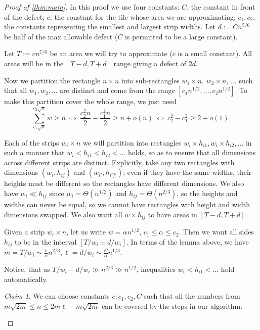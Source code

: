 \documentclass[11pt, reqno, psamsfonts]{amsart}
\theoremstyle{plain}
\theoremstyle{definition}
\theoremstyle{remark}
\newtheorem{claim}[theorem]{Claim}
\begin{document}
\begin{proof}[Proof of \cref{thm:main}]
In this proof we use four constants: $C$, the constant in front of the defect; $c$, the constant for the tile whose area we are approximating; $c_1, c_2$, the constants representing the smallest and largest strip widths.
Let $d := Cn^{5/6}$ be half of the max allowable defect ($C$ is permitted to be a large constant).

Let $T := cn^{7/6}$ be an area we will try to approximate ($c$ is a small constant). All areas will be in the $[T - d, T + d]$ range giving a defect of $2d$.

Now we partition the rectangle $n \times n$ into sub-rectangles $w_1 \times n$, $w_2 \times n$, $\ldots$ such that all $w_1, w_2, \ldots$ are distinct and come from the range $[c_1 n^{1/2}, \ldots, c_2 n^{1/2}]$. To make this partition cover the whole range, we just need 
\[
\sum_{c_1\sqrt{n}}^{c_2\sqrt{n}}w\geq n\ 
\Leftrightarrow\ 
\frac{c_2^2n}{2}-\frac{c_1^2n}{2}\geq n+o(n)\ 
\Leftrightarrow\ 
c_2^2 - c_1^2 \geq 2 + o(1).
\]

Each of the strips $w_i \times n$ we will partition into rectangles $w_i \times h_{i1}, w_i \times h_{i2}, \ldots$ in such a manner that  $w_i < h_{i1} < h_{i2} < \ldots$ holds, so as to ensure that all dimensions across different strips are distinct. Explicitly, take any two rectangles with dimensions $(w_i,h_{ij})$ and $(w_{i'},h_{i'j'})$; even if they have the same widths, their heights must be different so the rectangles have different dimensions. We also have $w_i \ll h_{ij}$ since $w_i=\Theta(n^{1/2})$ and $h_{ij}=\Theta(n^{2/3})$, so the heights and widths can never be equal, so we cannot have rectangles with height and width dimensions swapped. We also want all $w \times h_{ij}$ to have areas in $[T - d, T + d]$.

Given a strip $w_i \times n$, let us write $w = \alpha n^{1/2}$, $c_1 \leq \alpha \leq c_2$. 
Then we want all sides $h_{ij}$ to be in the interval $[T/w_i \pm d/w_i]$. In terms of the lemma above, we have $m = T / w_i \sim \frac{c}{\alpha}n^{2/3}, \ell = d / w_i \sim \frac{C}{\alpha}n^{1/3} $.

Notice, that as $T/w_i - d/w_i \gg n^{2/3} \gg n^{1/2}$, inequalities $w_i < h_{i1} < \ldots$ hold automatically.
\begin{claim}\label{clm:constants}
     We can choose constants $c,c_1,c_2,C$ such that all the numbers from $m\sqrt{2m}\leq n \leq 2m\ell - m\sqrt{2m}$ can be covered by the steps in our algorithm.   
\end{claim}


\end{proof}
\end{document}
